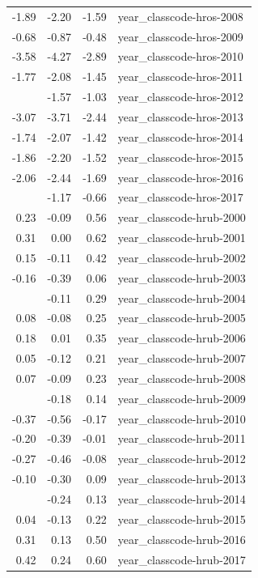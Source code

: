\documentclass[]{article}
\begin{document}
\begin{longtable}[t]{rrrl}
-1.89 & -2.20 & -1.59 & year\_classcode-hros-2008\\
-0.68 & -0.87 & -0.48 & year\_classcode-hros-2009\\
-3.58 & -4.27 & -2.89 & year\_classcode-hros-2010\\
-1.77 & -2.08 & -1.45 & year\_classcode-hros-2011\\
\addlinespace
-1.30 & -1.57 & -1.03 & year\_classcode-hros-2012\\
-3.07 & -3.71 & -2.44 & year\_classcode-hros-2013\\
-1.74 & -2.07 & -1.42 & year\_classcode-hros-2014\\
-1.86 & -2.20 & -1.52 & year\_classcode-hros-2015\\
-2.06 & -2.44 & -1.69 & year\_classcode-hros-2016\\
\addlinespace
-0.92 & -1.17 & -0.66 & year\_classcode-hros-2017\\
0.23 & -0.09 & 0.56 & year\_classcode-hrub-2000\\
0.31 & 0.00 & 0.62 & year\_classcode-hrub-2001\\
0.15 & -0.11 & 0.42 & year\_classcode-hrub-2002\\
-0.16 & -0.39 & 0.06 & year\_classcode-hrub-2003\\
\addlinespace
0.09 & -0.11 & 0.29 & year\_classcode-hrub-2004\\
0.08 & -0.08 & 0.25 & year\_classcode-hrub-2005\\
0.18 & 0.01 & 0.35 & year\_classcode-hrub-2006\\
0.05 & -0.12 & 0.21 & year\_classcode-hrub-2007\\
0.07 & -0.09 & 0.23 & year\_classcode-hrub-2008\\
\addlinespace
-0.02 & -0.18 & 0.14 & year\_classcode-hrub-2009\\
-0.37 & -0.56 & -0.17 & year\_classcode-hrub-2010\\
-0.20 & -0.39 & -0.01 & year\_classcode-hrub-2011\\
-0.27 & -0.46 & -0.08 & year\_classcode-hrub-2012\\
-0.10 & -0.30 & 0.09 & year\_classcode-hrub-2013\\
\addlinespace
-0.06 & -0.24 & 0.13 & year\_classcode-hrub-2014\\
0.04 & -0.13 & 0.22 & year\_classcode-hrub-2015\\
0.31 & 0.13 & 0.50 & year\_classcode-hrub-2016\\
0.42 & 0.24 & 0.60 & year\_classcode-hrub-2017\\

\end{longtable}
\end{document}
